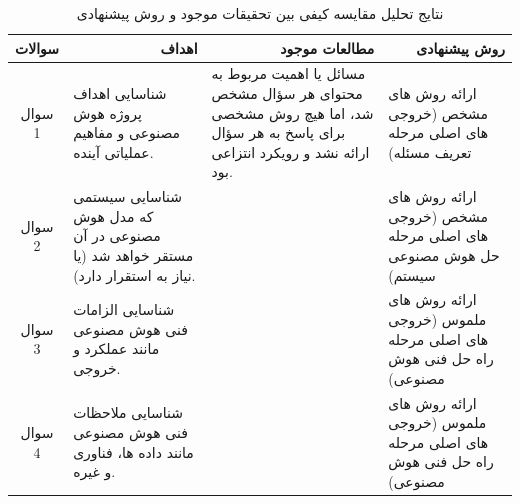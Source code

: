 \documentclass[a4paper,10pt]{article}
\begin{document}
\begin{table}[htbp]
\begin{tabularx}{\textwidth}{c c c c X}
            \hline

        \end{tabularx}
        
    \end{table}

    \newpage


    \begin{table}[htbp]
                        
        \centering
        \caption{نتایج تحلیل مقایسه کیفی بین تحقیقات موجود و روش پیشنهادی}
        \begin{tabularx}{\textwidth}{ c X X X }
            
            \hline

            \multicolumn{1}{c}{سوالات} & \multicolumn{1}{r}{اهداف} & \multicolumn{1}{r}{مطالعات موجود} & \multicolumn{1}{r}{روش پیشنهادی} \\

            \hline

            \multicolumn{1}{c}{سوال 1} & شناسایی اهداف پروژه هوش مصنوعی و مفاهیم عملیاتی آینده. & مسائل یا اهمیت مربوط به محتوای هر سؤال مشخص شد، اما هیچ روش مشخصی برای پاسخ به هر سؤال ارائه نشد و رویکرد انتزاعی بود. & ارائه روش های مشخص (خروجی های اصلی مرحله تعریف مسئله) \\
            \multicolumn{1}{c}{سوال 2} & شناسایی سیستمی که مدل هوش مصنوعی در آن مستقر خواهد شد (یا نیاز به استقرار دارد). &  & ارائه روش های مشخص (خروجی های اصلی مرحله حل هوش مصنوعی سیستم) \\
            \multicolumn{1}{c}{سوال 3} & شناسایی الزامات فنی هوش مصنوعی مانند عملکرد و خروجی. &  & ارائه روش های ملموس (خروجی های اصلی مرحله راه حل فنی هوش مصنوعی) \\
            \multicolumn{1}{c}{سوال 4} & شناسایی ملاحظات فنی هوش مصنوعی مانند داده ها، فناوری و غیره. &  & ارائه روش های ملموس (خروجی های اصلی مرحله راه حل فنی هوش مصنوعی) \\
            
            \hline

        \end{tabularx}
        
    \end{table}

    \newpage

\end{document}
